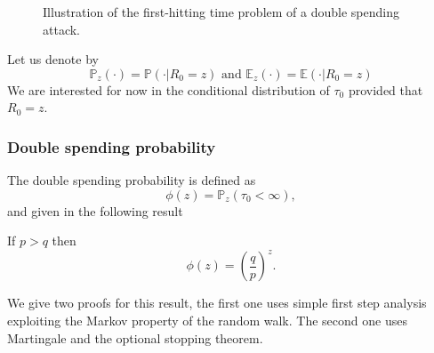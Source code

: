 \begin{figure}[ht!]
\begin{center}
\begin{tikzpicture}
\end{tikzpicture}
\end{center}
\caption{Illustration of the first-hitting time problem of a double spending attack.}
\label{fig:double_spending_time}
\end{figure}
Let us denote by 
$$
\mathbb{P}_z(\cdot) = \mathbb{P}(\cdot|R_0 = z)\text{ and }\mathbb{E}_z(\cdot) = \mathbb{E}(\cdot|R_0 = z) 
$$
We are interested for now in the conditional distribution of ${\tau_0}$ provided that $R_0 = z$.
\subsubsection{Double spending probability}\label{sssec:double_spending_rw_dsp}
The double spending probability is defined as 
$$
\phi(z)=\mathbb{P}_z({\tau_0} <\infty),
$$
and given in the following result
\begin{theo}
If $p>q$ then 
$$
\phi(z) = \left(\frac{q}{p}\right)^z.
$$
\end{theo}
\noindent We give two proofs for this result, the first one uses simple first step analysis exploiting the Markov property of the random walk. The second one uses Martingale and the optional stopping theorem.\\

